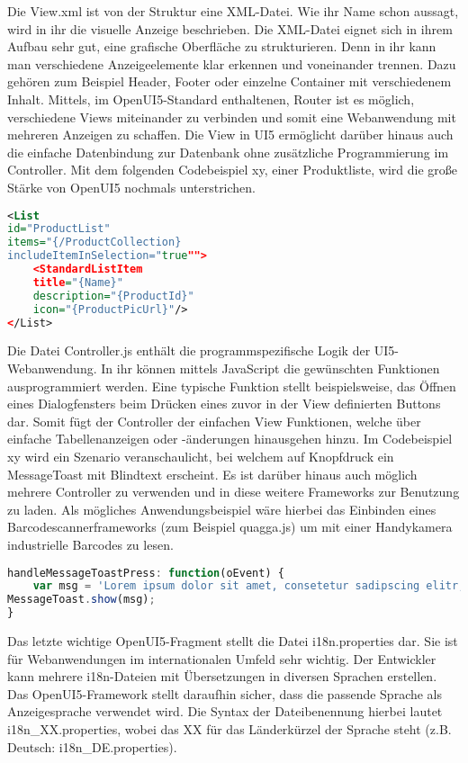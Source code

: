 Die View.xml ist von der Struktur eine XML-Datei. Wie ihr Name schon aussagt, wird in ihr die visuelle Anzeige beschrieben. Die XML-Datei eignet sich in ihrem Aufbau sehr gut, eine grafische Oberfläche zu strukturieren. Denn in ihr kann man verschiedene Anzeigeelemente klar erkennen und voneinander trennen. Dazu gehören zum Beispiel Header, Footer oder einzelne Container mit verschiedenem Inhalt. Mittels, im OpenUI5-Standard enthaltenen, Router ist es möglich, verschiedene Views miteinander zu verbinden und somit eine Webanwendung mit mehreren Anzeigen zu schaffen. Die View in UI5 ermöglicht darüber hinaus auch die einfache Datenbindung zur Datenbank ohne zusätzliche Programmierung im Controller. Mit dem folgenden Codebeispiel xy, einer Produktliste, wird die große Stärke von OpenUI5 nochmals unterstrichen.

\begin{lstlisting}[caption=Beispiel OpenUI5 View, label=lst:UI5View, language=XML]
<List
id="ProductList"
items="{/ProductCollection}
includeItemInSelection="true"">
	<StandardListItem
	title="{Name}"
	description="{ProductId}"
	icon="{ProductPicUrl}"/>
</List>
\end{lstlisting}

Die Datei Controller.js enthält die programmspezifische Logik der UI5-Webanwendung. In ihr können mittels JavaScript die gewünschten Funktionen ausprogrammiert werden. Eine typische Funktion stellt beispielsweise, das Öffnen eines Dialogfensters beim Drücken eines zuvor in der View definierten Buttons dar. Somit fügt der Controller der einfachen View Funktionen, welche über einfache Tabellenanzeigen oder -änderungen hinausgehen hinzu. Im Codebeispiel xy wird ein Szenario veranschaulicht, bei welchem auf Knopfdruck ein MessageToast mit Blindtext erscheint. Es ist darüber hinaus auch möglich mehrere Controller zu verwenden und in diese weitere Frameworks zur Benutzung zu laden. Als mögliches Anwendungsbeispiel wäre hierbei das Einbinden eines Barcodescannerframeworks (zum Beispiel quagga.js) um mit einer Handykamera industrielle Barcodes zu lesen. 

\begin{lstlisting}[caption=Beispiel OpenUI5 Controller, label=lst:UI5Controller, language=Javascript]
handleMessageToastPress: function(oEvent) {
	var msg = 'Lorem ipsum dolor sit amet, consetetur sadipscing elitr, sed diam nonumy\r\n eirmod.';
MessageToast.show(msg);
}
\end{lstlisting}

Das letzte wichtige OpenUI5-Fragment stellt die Datei i18n.properties dar. Sie ist für Webanwendungen im internationalen Umfeld sehr wichtig. Der Entwickler kann mehrere i18n-Dateien mit Übersetzungen in diversen Sprachen erstellen. Das OpenUI5-Framework stellt daraufhin sicher, dass die passende Sprache als Anzeigesprache verwendet wird. Die Syntax der Dateibenennung hierbei lautet i18n\_XX.properties, wobei das XX für das Länderkürzel der Sprache steht (z.B. Deutsch: i18n\_DE.properties).\autocites[vgl.][126\psqq]{Antolovic2014}


